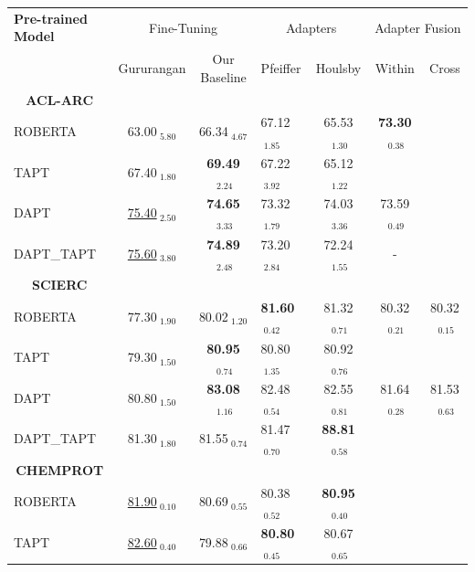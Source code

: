\documentclass[10pt,twocolumn,letterpaper]{article}
\begin{document}
\begin{table}[h]
    \centering
    \begin{tabular}{@{}lcc|lc|cc|@{}}
    \toprule
    \textbf{Pre-trained Model} & \multicolumn{2}{c}{Fine-Tuning} & \multicolumn{2}{c}{Adapters} & \multicolumn{2}{c}{Adapter Fusion} \\
    \cmidrule(lr){2-3} \cmidrule(lr){4-5} \cmidrule(lr){6-7}
    & Gururangan & Our Baseline & Pfeiffer & Houlsby & Within & Cross \\
    \midrule
    \multicolumn{1}{c}{\textbf{ACL-ARC}} \\
    ROBERTA & 63.00$_{\text{ 5.80}}$ & 66.34$_{\text{ 4.67}}$ & 67.12$_{\text{ 1.85}}$ & 65.53$_{\text{ 1.30}}$ & \textbf{73.30}$_{\text{ 0.38}}$  \\
    TAPT & 67.40$_{\text{ 1.80}}$ & \textbf{69.49}$_{\text{ 2.24}}$ & 67.22$_{\text{ 3.92}}$ & 65.12$_{\text{ 1.22}}$ & & \\ 
    DAPT & \underline{75.40}$_{\text{ 2.50}}$ & \textbf{74.65}$_{\text{ 3.33}}$ & 73.32$_{\text{ 1.79}}$ & 74.03$_{\text{ 3.36}}$ & 73.59$_{\text{ 0.49}}$ & \\ 
    DAPT\_TAPT & \underline{75.60}$_{\text{ 3.80}}$ & \textbf{74.89}$_{\text{ 2.48}}$ & 73.20$_{\text{ 2.84}}$ & 72.24$_{\text{ 1.55}}$ & - & \\ 
    \midrule
    \multicolumn{1}{c}{\textbf{SCIERC}} \\
    ROBERTA & 77.30$_{\text{ 1.90}}$ & 80.02$_{\text{ 1.20}}$ & \textbf{81.60}$_{\text{ 0.42}}$ & 81.32$_{\text{ 0.71}}$ & 80.32$_{\text{ 0.21}}$ & 80.32$_{\text{ 0.15}}$ \\ 
    TAPT & 79.30$_{\text{ 1.50}}$ & \textbf{80.95}$_{\text{ 0.74}}$ & 80.80$_{\text{ 1.35}}$ & 80.92$_{\text{ 0.76}}$ & & \\ 
    DAPT & 80.80$_{\text{ 1.50}}$ & \textbf{83.08}$_{\text{ 1.16}}$ & 82.48$_{\text{ 0.54}}$ & 82.55$_{\text{ 0.81}}$ & 81.64$_{\text{ 0.28}}$ & 81.53$_{\text{ 0.63}}$ \\ 
    DAPT\_TAPT & 81.30$_{\text{ 1.80}}$ & 81.55$_{\text{ 0.74}}$ & 81.47$_{\text{ 0.70}}$ & \textbf{88.81}$_{\text{ 0.58}}$ & & \\ 
    \midrule
    \multicolumn{1}{c}{\textbf{CHEMPROT}} \\
    ROBERTA & \underline{81.90}$_{\text{ 0.10}}$ & 80.69$_{\text{ 0.55}}$ & 80.38$_{\text{ 0.52}}$ & \textbf{80.95}$_{\text{ 0.40}}$ & & \\ 
    TAPT & \underline{82.60}$_{\text{ 0.40}}$ & 79.88$_{\text{ 0.66}}$ & \textbf{80.80}$_{\text{ 0.45}}$ & 80.67$_{\text{ 0.65}}$ & & \\ 

\end{tabular}
\end{table}
\end{document}
